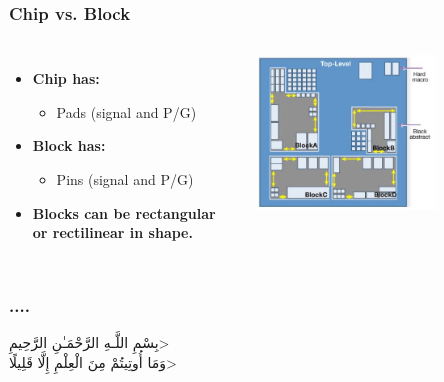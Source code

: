 \documentclass[compress]{beamer}
\begin{document}
\begin{Form}
	\frametitle{Chip vs. Block}
			\begin{columns}	
		\begin{itemize}
			\item \textbf{Chip has:}
				\begin{itemize}
					\item Pads (signal and P/G)
				\end{itemize}
			\item \textbf{Block has: }		
				\begin{itemize}
					\item Pins (signal and P/G)
				\end{itemize}
			
				\item \textbf{Blocks can be
				rectangular or
				rectilinear in shape.}
					
		\end{itemize}
		\begin{center}
			\includegraphics[width=0.7\textwidth]{partitioning}
		\end{center}
	\end{columns}
\end{Form}
	\begin{frame}
		\frametitle{....}
		\begin{center}
			\<بِسْمِ اللَّـهِ الرَّحْمَـٰنِ الرَّحِيمِ> \\
			\<وَمَا أُوتِيتُمْ مِنَ الْعِلْمِ إِلَّا قَلِيلًا>
			
		\end{center}
	\end{frame}
\end{document}
